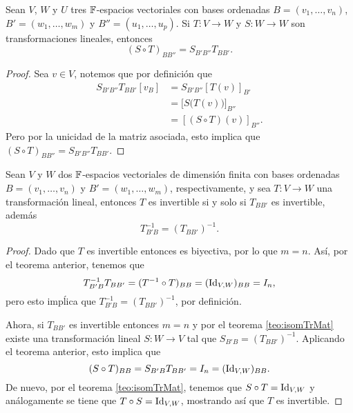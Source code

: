 \begin{teor}
  Sean $V$, $W$ y $U$ tres $\mathbb{F}$-espacios vectoriales con bases ordenadas $B = (v_1,\ldots,v_n)$, $B' = (w_1,\ldots,w_m)$ y $B'' = (u_1,\ldots,u_p)$. Si $T\colon V \to W$ y $S\colon W \to W$ son transformaciones lineales, entonces
  \[ (S \circ T)_{BB''} = S_{B'B''} T_{BB'}. \]
\end{teor}
\begin{proof}
  Sea $v \in V$, notemos que por definición que
    \begin{align*}
      S_{B'B''} T_{BB'}[v_B] &= S_{B'B''}[T(v)]_{B'} \\
        &= \bigl[ S\bigl(T(v)\bigr) \bigr]_{B''} \\
        &= [(S\circ T)(v)]_{B''}.
    \end{align*}
  Pero por la unicidad de la matriz asociada, esto implica que $(S \circ T)_{BB''} = S_{B'B''} T_{BB'}$.
\end{proof}

\begin{coro}
  Sean $V$ y $W$ dos $\mathbb{F}$-espacios vectoriales de dimensión finita con bases ordenadas $B = (v_1,\ldots,v_n)$ y $B' = (w_1,\ldots,w_m)$, respectivamente, y sea $T\colon V \to W$ una transformación lineal, entonces $T$ es invertible si y solo si $T_{BB'}$ es invertible, además
    \[ T_{B'B}^{-1} = (T_{BB'})^{-1}. \]
\end{coro}
\begin{proof}
  Dado que $T$ es invertible entonces es biyectiva, por lo que $m = n$. Así, por el teorema anterior, tenemos que
  \[ T^{-1}_{B'B} T_{BB'} = (T^{-1}\circ T)_{BB} = (\mathrm{Id}_{V,W})_{BB} = I_n, \]
  pero esto impĺica que $T_{B'B}^{-1} = (T_{BB'})^{-1}$, por definición.

  Ahora, si $T_{BB'}$ es invertible entonces $m = n$ y por el teorema \ref{teo:isomTrMat} existe una transformación lineal $S\colon W \to V$ tal que $S_{B'B} =  (T_{BB'})^{-1}$. Aplicando el teorema anterior, esto implica que
    \[ (S \circ T)_{BB} =  S_{B'B}T_{BB'} = I_n = (\mathrm{Id}_{V,W})_{BB}. \]
  De nuevo, por el teorema \ref{teo:isomTrMat}, tenemos que $S \circ T = \mathrm{Id}_{V,W}$ y análogamente se tiene que $T \circ S = \mathrm{Id}_{V,W}$, mostrando así que $T$ es invertible.
\end{proof}


\ExerciseSection

